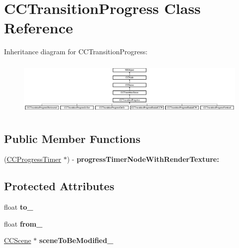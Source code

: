 \hypertarget{interface_c_c_transition_progress}{\section{C\-C\-Transition\-Progress Class Reference}
\label{interface_c_c_transition_progress}
}
Inheritance diagram for C\-C\-Transition\-Progress\-:\begin{figure}[H]
\begin{center}
\leavevmode
\includegraphics[height=2.692308cm]{interface_c_c_transition_progress}
\end{center}
\end{figure}
\subsection*{Public Member Functions}
\begin{DoxyCompactItemize}
\item 
\hypertarget{interface_c_c_transition_progress_a38562a143886f1f3383ae55dab18074c}{(\hyperlink{interface_c_c_progress_timer}{C\-C\-Progress\-Timer} $\ast$) -\/ {\bfseries progress\-Timer\-Node\-With\-Render\-Texture\-:}}\label{interface_c_c_transition_progress_a38562a143886f1f3383ae55dab18074c}

\end{DoxyCompactItemize}
\subsection*{Protected Attributes}
\begin{DoxyCompactItemize}
\item 
\hypertarget{interface_c_c_transition_progress_a0f4c5aee9cb1d01a52057cf644771e2b}{float {\bfseries to\-\_\-}}\label{interface_c_c_transition_progress_a0f4c5aee9cb1d01a52057cf644771e2b}

\item 
\hypertarget{interface_c_c_transition_progress_a3bbf4e489fc0c471a01e350e62a6e569}{float {\bfseries from\-\_\-}}\label{interface_c_c_transition_progress_a3bbf4e489fc0c471a01e350e62a6e569}

\item 
\hypertarget{interface_c_c_transition_progress_a36a134472b5440ca5cd1123594de4610}{\hyperlink{interface_c_c_scene}{C\-C\-Scene} $\ast$ {\bfseries scene\-To\-Be\-Modified\-\_\-}}\label{interface_c_c_transition_progress_a36a134472b5440ca5cd1123594de4610}

\end{DoxyCompactItemize}


